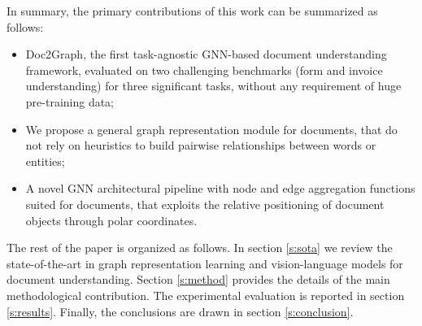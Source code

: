 \documentclass[runningheads]{llncs}
\begin{document}
In summary, the primary contributions of this work can be summarized as follows:
\begin{itemize}
    \item Doc2Graph, the first task-agnostic GNN-based document understanding framework, evaluated on two challenging benchmarks (form and invoice understanding) for three significant tasks, without any requirement of huge pre-training data;
    \item We propose a general graph representation module for documents, that do not rely on heuristics to build pairwise relationships between words or entities;
    \item A novel GNN architectural pipeline with node and edge aggregation functions suited for documents, that exploits the relative positioning of document objects through polar coordinates.
\end{itemize}   

The rest of the paper is organized as follows. In section \ref{s:sota} we review the state-of-the-art in graph representation learning and vision-language models for document understanding. Section \ref{s:method} provides the details of the main methodological contribution. The experimental evaluation is reported in section \ref{s:results}. Finally, the conclusions are drawn in section \ref{s:conclusion}.

 
\end{document}
